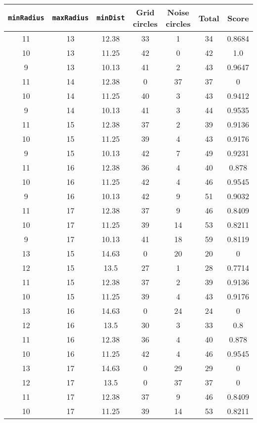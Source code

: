 \documentclass[letterpaper, 12pt]{article}
\begin{document}
\begin{longtable}{|c|c|c|c|c|c|c|}
\hline
\textbf{\texttt{minRadius}} & \textbf{\texttt{maxRadius}} & \textbf{\texttt{minDist}} & \textbf{Grid circles} & \textbf{Noise circles} & \textbf{Total} & \textbf{Score} \\
\hline
11 & 13 & 12.38 & 33 & 1 & 34 & 0.8684 \\
\hline
10 & 13 & 11.25 & 42 & 0 & 42 & 1.0 \\
\hline
9 & 13 & 10.13 & 41 & 2 & 43 & 0.9647 \\
\hline
11 & 14 & 12.38 & 0 & 37 & 37 & 0 \\
\hline
10 & 14 & 11.25 & 40 & 3 & 43 & 0.9412 \\
\hline
9 & 14 & 10.13 & 41 & 3 & 44 & 0.9535 \\
\hline
11 & 15 & 12.38 & 37 & 2 & 39 & 0.9136 \\
\hline
10 & 15 & 11.25 & 39 & 4 & 43 & 0.9176 \\
\hline
9 & 15 & 10.13 & 42 & 7 & 49 & 0.9231 \\
\hline
11 & 16 & 12.38 & 36 & 4 & 40 & 0.878 \\
\hline
10 & 16 & 11.25 & 42 & 4 & 46 & 0.9545 \\
\hline
9 & 16 & 10.13 & 42 & 9 & 51 & 0.9032 \\
\hline
11 & 17 & 12.38 & 37 & 9 & 46 & 0.8409 \\
\hline
10 & 17 & 11.25 & 39 & 14 & 53 & 0.8211 \\
\hline
9 & 17 & 10.13 & 41 & 18 & 59 & 0.8119 \\
\hline
13 & 15 & 14.63 & 0 & 20 & 20 & 0 \\
\hline
12 & 15 & 13.5 & 27 & 1 & 28 & 0.7714 \\
\hline
11 & 15 & 12.38 & 37 & 2 & 39 & 0.9136 \\
\hline
10 & 15 & 11.25 & 39 & 4 & 43 & 0.9176 \\
\hline
13 & 16 & 14.63 & 0 & 24 & 24 & 0 \\
\hline
12 & 16 & 13.5 & 30 & 3 & 33 & 0.8 \\
\hline
11 & 16 & 12.38 & 36 & 4 & 40 & 0.878 \\
\hline
10 & 16 & 11.25 & 42 & 4 & 46 & 0.9545 \\
\hline
13 & 17 & 14.63 & 0 & 29 & 29 & 0 \\
\hline
12 & 17 & 13.5 & 0 & 37 & 37 & 0 \\
\hline
11 & 17 & 12.38 & 37 & 9 & 46 & 0.8409 \\
\hline
10 & 17 & 11.25 & 39 & 14 & 53 & 0.8211 \\

\end{longtable}
\end{document}

